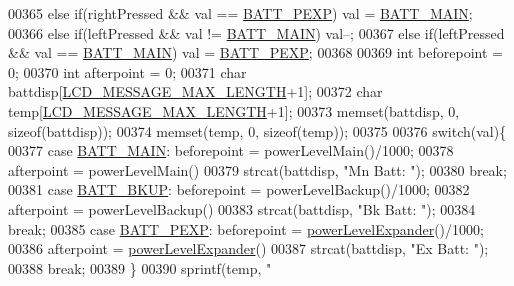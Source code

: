 \begin{DoxyCode}
{00365         \textcolor{keywordflow}{else} \textcolor{keywordflow}{if}(rightPressed && val == \hyperlink{sensors_8h_aaad063d8cfbd393cdc04bcaae68b48ef}{BATT\_PEXP}) val = \hyperlink{sensors_8h_aa48831e4de90908c1b37560e7aba2c5f}{BATT\_MAIN};
00366         \textcolor{keywordflow}{else} \textcolor{keywordflow}{if}(leftPressed && val != \hyperlink{sensors_8h_aa48831e4de90908c1b37560e7aba2c5f}{BATT\_MAIN}) val--;
00367         \textcolor{keywordflow}{else} \textcolor{keywordflow}{if}(leftPressed && val == \hyperlink{sensors_8h_aa48831e4de90908c1b37560e7aba2c5f}{BATT\_MAIN}) val = \hyperlink{sensors_8h_aaad063d8cfbd393cdc04bcaae68b48ef}{BATT\_PEXP};
00368 
00369         \textcolor{keywordtype}{int} beforepoint = 0;
00370         \textcolor{keywordtype}{int} afterpoint = 0;
00371         \textcolor{keywordtype}{char} battdisp[\hyperlink{lcdmsg_8h_abe4c4b70fc6f44ae3680e5b2c68cdd00}{LCD\_MESSAGE\_MAX\_LENGTH}+1];
00372         \textcolor{keywordtype}{char} temp[\hyperlink{lcdmsg_8h_abe4c4b70fc6f44ae3680e5b2c68cdd00}{LCD\_MESSAGE\_MAX\_LENGTH}+1];
00373         memset(battdisp, 0, \textcolor{keyword}{sizeof}(battdisp));
00374         memset(temp, 0, \textcolor{keyword}{sizeof}(temp));
00375 
00376         \textcolor{keywordflow}{switch}(val)\{
00377             \textcolor{keywordflow}{case} \hyperlink{sensors_8h_aa48831e4de90908c1b37560e7aba2c5f}{BATT\_MAIN}: beforepoint = powerLevelMain()/1000;
00378                             afterpoint = powerLevelMain()%
00379                             strcat(battdisp, \textcolor{stringliteral}{"Mn Batt: "});
00380                             \textcolor{keywordflow}{break};
00381             \textcolor{keywordflow}{case} \hyperlink{sensors_8h_a5af8f9e877197004f0f5bf982a755146}{BATT\_BKUP}: beforepoint = powerLevelBackup()/1000;
00382                             afterpoint = powerLevelBackup()%
00383                             strcat(battdisp, \textcolor{stringliteral}{"Bk Batt: "});
00384                             \textcolor{keywordflow}{break};
00385             \textcolor{keywordflow}{case} \hyperlink{sensors_8h_aaad063d8cfbd393cdc04bcaae68b48ef}{BATT\_PEXP}: beforepoint = \hyperlink{sensors_8h_af8de9fe9eba1282f34dce42deebffc93}{powerLevelExpander}()/1000;
00386                             afterpoint = \hyperlink{sensors_8h_af8de9fe9eba1282f34dce42deebffc93}{powerLevelExpander}()%
00387                             strcat(battdisp, \textcolor{stringliteral}{"Ex Batt: "});
00388                             \textcolor{keywordflow}{break};
00389         \}
00390         sprintf(temp, \textcolor{stringliteral}{"%
}}
\end{DoxyCode}
